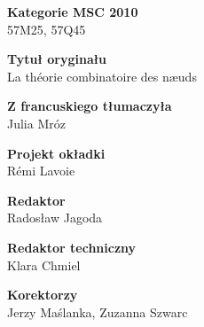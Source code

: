 {\noindent \textbf{Kategorie MSC 2010}\\57M25, 57Q45}
\vspace{5mm}

{\noindent \textbf{Tytuł oryginału}\\La théorie combinatoire des næuds}
\vspace{5mm}

{\noindent \textbf{Z francuskiego tłumaczyła}\\Julia Mróz}
\vspace{5mm}

{\noindent \textbf{Projekt okładki}\\Rémi Lavoie}
\vspace{5mm}

{\noindent \textbf{Redaktor}\\Radosław Jagoda}
\vspace{5mm}

{\noindent \textbf{Redaktor techniczny}\\Klara Chmiel}
\vspace{5mm}

{\noindent \textbf{Korektorzy}\\Jerzy Maślanka, Zuzanna Szwarc}



\tableofcontents